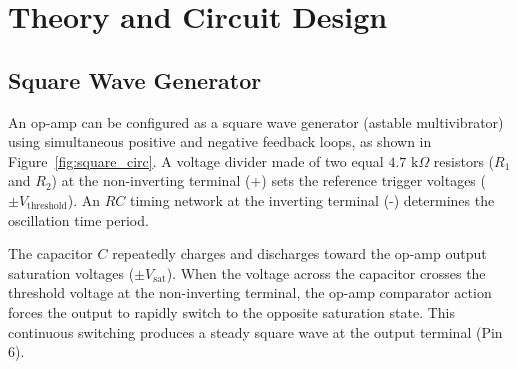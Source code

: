 \documentclass[11pt,a4paper]{article}
\begin{document}
\section{Theory and Circuit Design}

\subsection{Square Wave Generator}
An op-amp can be configured as a square wave generator (astable multivibrator) using simultaneous positive and negative feedback loops, as shown in Figure~\ref{fig:square_circ}. A voltage divider made of two equal $4.7\text{ k}\Omega$ resistors ($R_1$ and $R_2$) at the non-inverting terminal (+) sets the reference trigger voltages ($\pm V_{\text{threshold}}$). An $RC$ timing network at the inverting terminal (-) determines the oscillation time period.

The capacitor $C$ repeatedly charges and discharges toward the op-amp output saturation voltages ($\pm V_{\text{sat}}$). When the voltage across the capacitor crosses the threshold voltage at the non-inverting terminal, the op-amp comparator action forces the output to rapidly switch to the opposite saturation state. This continuous switching produces a steady square wave at the output terminal (Pin 6).
\end{document}
